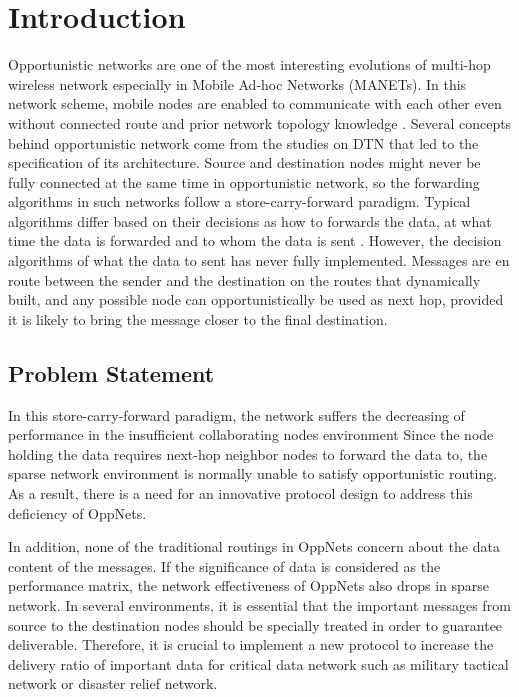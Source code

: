 \chapter{Introduction}
\label{intro}

Opportunistic networks are one of the most interesting evolutions of multi-hop wireless network especially in Mobile Ad-hoc Networks (MANETs). 
In this network scheme, mobile nodes are enabled to communicate with each other even without connected route and prior network topology knowledge \cite{4014485}.
Several concepts behind opportunistic network come from the studies on DTN that led to the specification of its architecture. 
Source and destination nodes might never be fully connected at the same time in opportunistic network, so the forwarding algorithms in such networks follow a store-carry-forward paradigm. Typical algorithms differ based on their decisions as how to forwards the data, at what time the data is forwarded and to whom the data is sent \cite{Joe2010}. 
However, the decision algorithms of what the data to sent has never fully implemented. 
Messages are en route between the sender and the destination on the routes that dynamically built, and any possible node can opportunistically be used as next hop, provided it is likely to bring the message closer to the final destination.
\section{Problem Statement}
\label{intro:Problem Statement}
In this store-carry-forward paradigm, the network suffers the decreasing of performance in the insufficient collaborating nodes environment \cite{6196145,Spyropoulos2010}
Since the node holding the data requires next-hop neighbor nodes to forward the data to, the sparse network environment is normally unable to satisfy opportunistic routing.
As a result, there is a need for an innovative protocol design to address this deficiency of OppNets.

In addition, none of the traditional routings in OppNets concern about the data content of the messages. 
If the significance of data is considered as the performance matrix, the network effectiveness of OppNets also drops in sparse network. 
In several environments, it is essential that the important messages from source to the destination nodes should be specially treated in order to guarantee deliverable.
Therefore, it is crucial to implement a new protocol to increase the delivery ratio of important data for critical data network such as military tactical network or disaster relief network.

